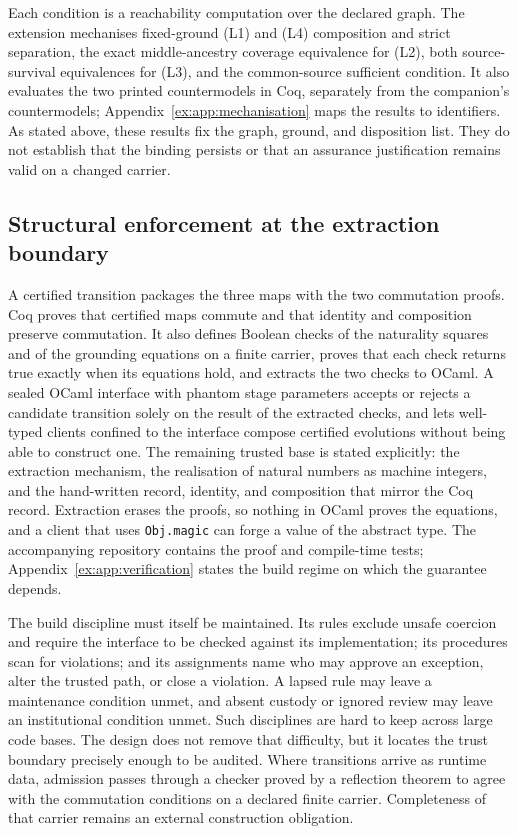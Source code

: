 \documentclass[smallextended,envcountsect,envcountsame,natbib]{svjour3}
\newcommand{\code}[1]{\texttt{#1}}
\begin{document}
Each condition is a reachability computation over the declared graph. The extension mechanises fixed-ground (L1) and (L4) composition and strict separation, the exact middle-ancestry coverage equivalence for (L2), both source-survival equivalences for (L3), and the common-source sufficient condition. It also evaluates the two printed countermodels in Coq, separately from the companion's countermodels; Appendix~\ref{ex:app:mechanisation} maps the results to identifiers. As stated above, these results fix the graph, ground, and disposition list. They do not establish that the binding persists or that an assurance justification remains valid on a changed carrier.

\subsection{Structural enforcement at the extraction boundary}\label{ex:sec:structural-enforcement}

A certified transition packages the three maps with the two commutation proofs. Coq proves that certified maps commute and that identity and composition preserve commutation. It also defines Boolean checks of the naturality squares and of the grounding equations on a finite carrier, proves that each check returns true exactly when its equations hold, and extracts the two checks to OCaml. A sealed OCaml interface with phantom stage parameters accepts or rejects a candidate transition solely on the result of the extracted checks, and lets well-typed clients confined to the interface compose certified evolutions without being able to construct one. The remaining trusted base is stated explicitly: the extraction mechanism, the realisation of natural numbers as machine integers, and the hand-written record, identity, and composition that mirror the Coq record. Extraction erases the proofs, so nothing in OCaml proves the equations, and a client that uses \code{Obj.magic} can forge a value of the abstract type. The accompanying repository contains the proof and compile-time tests; Appendix~\ref{ex:app:verification} states the build regime on which the guarantee depends.

The build discipline must itself be maintained. Its rules exclude unsafe coercion and require the interface to be checked against its implementation; its procedures scan for violations; and its assignments name who may approve an exception, alter the trusted path, or close a violation. A lapsed rule may leave a maintenance condition unmet, and absent custody or ignored review may leave an institutional condition unmet. Such disciplines are hard to keep across large code bases. The design does not remove that difficulty, but it locates the trust boundary precisely enough to be audited. Where transitions arrive as runtime data, admission passes through a checker proved by a reflection theorem to agree with the commutation conditions on a declared finite carrier. Completeness of that carrier remains an external construction obligation.
\end{document}

